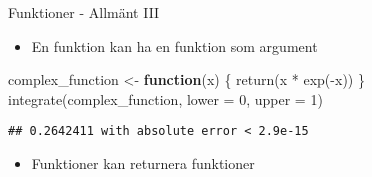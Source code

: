 \documentclass[
  11pt,
  ignorenonframetext,
]{beamer}
\newenvironment{Shaded}{\begin{snugshade}}{\end{snugshade}}
\newcommand{\AttributeTok}[1]{\textcolor[rgb]{0.77,0.63,0.00}{#1}}
\newcommand{\ControlFlowTok}[1]{\textcolor[rgb]{0.13,0.29,0.53}{\textbf{#1}}}
\newcommand{\DecValTok}[1]{\textcolor[rgb]{0.00,0.00,0.81}{#1}}
\newcommand{\FunctionTok}[1]{\textcolor[rgb]{0.00,0.00,0.00}{#1}}
\newcommand{\NormalTok}[1]{#1}
\newcommand{\OtherTok}[1]{\textcolor[rgb]{0.56,0.35,0.01}{#1}}
\newcommand{\SpecialCharTok}[1]{\textcolor[rgb]{0.00,0.00,0.00}{#1}}
\providecommand{\tightlist}{%
  \setlength{\itemsep}{0pt}\setlength{\parskip}{0pt}}
\begin{document}
\begin{frame}[fragile]{Funktioner - Allmänt III}
\protect\hypertarget{funktioner---allmuxe4nt-iii}{}
\begin{itemize}
\tightlist
\item
  En funktion kan ha en funktion som argument
\end{itemize}

\begin{Shaded}
\begin{Highlighting}[]
\NormalTok{complex\_function }\OtherTok{\textless{}{-}} \ControlFlowTok{function}\NormalTok{(x) \{}
  \FunctionTok{return}\NormalTok{(x }\SpecialCharTok{*} \FunctionTok{exp}\NormalTok{(}\SpecialCharTok{{-}}\NormalTok{x))}
\NormalTok{\}}
\FunctionTok{integrate}\NormalTok{(complex\_function, }\AttributeTok{lower =} \DecValTok{0}\NormalTok{, }\AttributeTok{upper =} \DecValTok{1}\NormalTok{)}
\end{Highlighting}
\end{Shaded}

\begin{verbatim}
## 0.2642411 with absolute error < 2.9e-15
\end{verbatim}

\begin{itemize}
\tightlist
\item
  Funktioner kan returnera funktioner
\end{itemize}
\end{frame}
\end{document}
